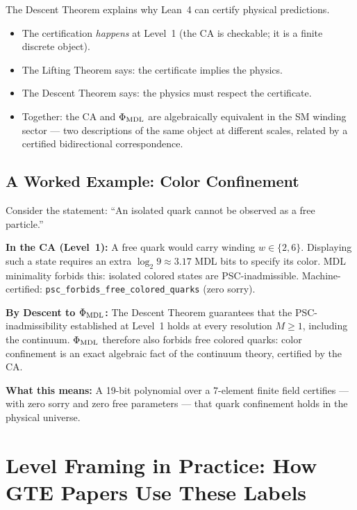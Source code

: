 \documentclass[11pt,a4paper]{article}
\newcommand{\lean}[1]{\texttt{#1}}
\newcommand{\PhiMDL}{\Phi_{\rm MDL}}
\begin{document}
The Descent Theorem explains why Lean~4 can certify physical predictions.

\begin{itemize}[itemsep=5pt]
  \item The certification \emph{happens} at Level~1 (the CA is checkable;
    it is a finite discrete object).
  \item The Lifting Theorem says: the certificate implies the physics.
  \item The Descent Theorem says: the physics must respect the certificate.
  \item Together: the CA and $\PhiMDL$ are algebraically equivalent in the
    SM winding sector --- two descriptions of the same object at different
    scales, related by a certified bidirectional correspondence.
\end{itemize}

\subsection{A Worked Example: Color Confinement}

Consider the statement: ``An isolated quark cannot be observed as a free
particle.''

\medskip
\noindent
\textbf{In the CA (Level~1):}
A free quark would carry winding $w \in \{2, 6\}$.
Displaying such a state requires an extra $\log_2 9 \approx 3.17$ MDL bits
to specify its color.
MDL minimality forbids this: isolated colored states are PSC-inadmissible.
Machine-certified: \lean{psc\_forbids\_free\_colored\_quarks} (zero sorry).

\medskip
\noindent
\textbf{By Descent to $\PhiMDL$:}
The Descent Theorem guarantees that the PSC-inadmissibility established at
Level~1 holds at every resolution $M \geq 1$, including the continuum.
$\PhiMDL$ therefore also forbids free colored quarks: color confinement is
an exact algebraic fact of the continuum theory, certified by the CA.

\medskip
\noindent
\textbf{What this means:}
A 19-bit polynomial over a 7-element finite field certifies --- with zero
sorry and zero free parameters --- that quark confinement holds in the
physical universe.

\section{Level Framing in Practice: How GTE Papers Use These Labels}
\label{sec:practice}
\end{document}
